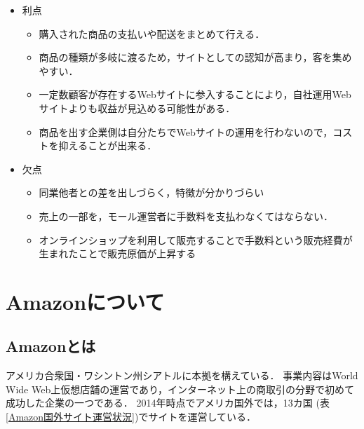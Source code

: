 \begin{itemize}
 \item	利点
\begin{itemize}
\setlength{\parskip}{3mm}
 \item	購入された商品の支払いや配送をまとめて行える．
 \item	商品の種類が多岐に渡るため，サイトとしての認知が高まり，客を集めやすい．
 \item	一定数顧客が存在するWebサイトに参入することにより，自社運用Webサイトよりも収益が見込める可能性がある．
 \item	商品を出す企業側は自分たちでWebサイトの運用を行わないので，コストを抑えることが出来る．

\end{itemize}


 \item	欠点
\begin{itemize}
\setlength{\parskip}{3mm}
 \item	同業他者との差を出しづらく，特徴が分かりづらい
 \item	売上の一部を，モール運営者に手数料を支払わなくてはならない．
 \item	オンラインショップを利用して販売することで手数料という販売経費が生まれたことで販売原価が上昇する
	
\end{itemize}

\end{itemize}








\chapter{Amazonについて}


\section{Amazonとは}

アメリカ合衆国・ワシントン州シアトルに本拠を構えている．
事業内容はWorld Wide Web上仮想店舗の運営であり，インターネット上の商取引の分野で初めて成功した企業の一つである．
2014年時点でアメリカ国外では，13カ国 (表\ref{Amazon国外サイト運営状況})でサイトを運営している．



